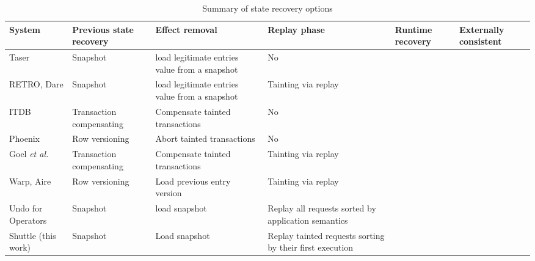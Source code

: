 \begin{center}
\begin{table}[ht]
\begin{tabular}{|m{2.5cm}|m{2.4cm}|m{2.7cm}|m{2.5cm}|C{1.5cm}|C{1.8cm}|}
\hline
\textbf{System} & \textbf{Previous state recovery}		& \textbf{Effect removal} & \textbf{Replay phase} & \textbf{Runtime recovery} & \textbf{Externally consistent} \\ \hline
\cite{taser}Taser			  		& Snapshot 	& load legitimate entries value from a snapshot & No &  &  \\ \hline
\cite{retro} \cite{dare} RETRO, Dare	& Snapshot 	& load legitimate entries value from a snapshot & Tainting \newline via replay & &  \\ \hline
\cite{itdb} ITDB						& Transaction compensating & Compensate tainted \newline transactions & No & \cmark & \\ \hline
\cite{phoenix} Phoenix					& Row \newline versioning & Abort tainted transactions & No & 	&		\\ \hline
\cite{goel} Goel \textit{et al.}	& Transaction compensating & Compensate tainted \newline transactions & Tainting \newline via replay & & \\ \hline
\cite{warp} \cite{aire} Warp, Aire		& Row \newline versioning & Load previous entry version & Tainting \newline via replay & \cmark & \cmark	\\ \hline
\cite{undoForOperators} Undo for \newline Operators	& Snapshot & load snapshot & Replay all \newline requests sorted by application semantics & & \cmark		\\ \hline
Shuttle	\newline  (this work)								& Snapshot & Load snapshot & Replay tainted requests sorting by their first \newline execution & \cmark  & \cmark \\ \hline

\end{tabular}
\caption{Summary of state recovery options}
\label{tab:recovery}
\end{table}
\end{center} 
\vskip-7mm

